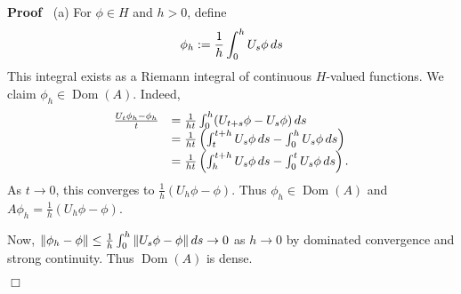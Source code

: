 \documentclass{article}
\newcommand{\assign}{:=}
\newcommand{\tmop}[1]{\ensuremath{\operatorname{#1}}}
\newenvironment{proof}{\noindent\textbf{Proof\ }}{\hspace*{\fill}$\Box$\medskip}
\newcommand{\1}{\mathbbm{1}}
\newcommand{\Dom}{\tmop{Dom}}
\begin{document}
\begin{proof}
  (a) For $\phi \in H$ and $h > 0$, define
  \begin{equation}
    \phi_h \assign \frac{1}{h}  \int_0^h U_s \phi \hspace{0.17em} ds
  \end{equation}
  This integral exists as a Riemann integral of continuous $H$-valued
  functions. We claim $\phi_h \in \Dom (A)$. Indeed,
  \begin{equation}
    \begin{array}{ll}
      \frac{U_t \phi_h - \phi_h}{t} & = \frac{1}{ht}  \int_0^h (U_{t + s} \phi
      - U_s \phi)  \hspace{0.17em} ds\\
      & = \frac{1}{ht}  \left( \int_t^{t + h} U_s \phi \hspace{0.17em} ds -
      \int_0^h U_s \phi \hspace{0.17em} ds \right)\\
      & = \frac{1}{ht}  \left( \int_h^{t + h} U_s \phi \hspace{0.17em} ds -
      \int_0^t U_s \phi \hspace{0.17em} ds \right) .
    \end{array}
  \end{equation}
  As $t \to 0$, this converges to $\frac{1}{h}  (U_h \phi - \phi)$. Thus
  $\phi_h \in \Dom (A)$ and $A \phi_h = \frac{1}{h}  (U_h \phi - \phi)$.
  
  Now, $\| \phi_h - \phi \| \leq \frac{1}{h}  \int_0^h \|U_s \phi - \phi \| 
  \hspace{0.17em} ds \to 0$ as $h \to 0$ by dominated convergence and strong
  continuity. Thus $\Dom (A)$ is dense.
  

\end{proof}
\end{document}
